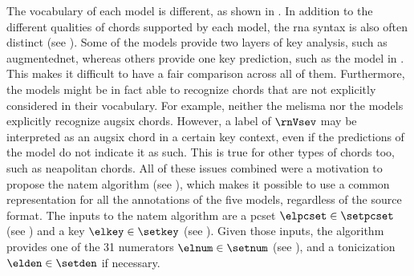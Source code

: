 
The vocabulary of each model is different, as shown in
. In addition to the different
qualities of chords supported by each model, the \gls{rna}
syntax is also often distinct (see
). Some of
the models provide two layers of key analysis, such as
\gls{augmentednet}, whereas others provide one key
prediction, such as the model in
\textcite{mcleod2021modular}. This makes it difficult to
have a fair comparison across all of them. Furthermore, the
models might be in fact able to recognize chords that are
not explicitly considered in their vocabulary. For example,
neither the \gls{melisma} nor the
\textcite{mcleod2021modular} models explicitly recognize
\gls{augsix} chords. However, a label of $\rnVsev$ may be
interpreted as an \gls{augsix} chord in a certain key
context, even if the predictions of the model do not
indicate it as such. This is true for other types of chords
too, such as \gls{neapolitan} chords. All of these issues
combined were a motivation to propose the \gls{natem}
algorithm (see
), which
makes it possible to use a common representation for all the
annotations of the five models, regardless of the source
format. The inputs to the \gls{natem} algorithm are a
\gls{pcset} $\elpcset \in \setpcset$ (see
) and a key $\elkey
\in \setkey$ (see ).
Given those inputs, the algorithm provides one of the 31
numerators $\elnum \in \setnum$ (see
), and a
tonicization $\elden \in \setden$ if necessary.

